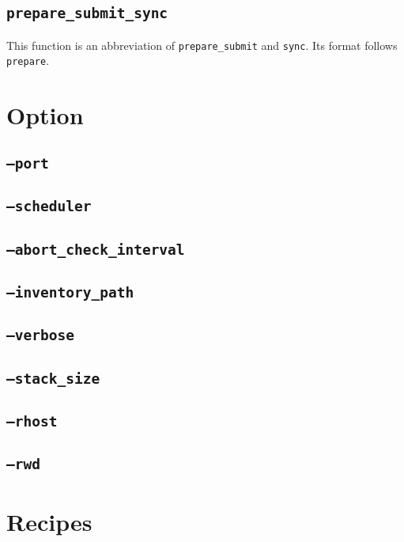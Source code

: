 \documentclass[a4paper,10pt]{report}
\begin{document}
\section{\texttt{prepare\_submit\_sync}}

This function is an abbreviation of \texttt{prepare\_submit} and
\texttt{sync}.  Its format follows \texttt{prepare}.

\chapter{Option}\label{chapoption}

\section{\texttt{--port}}
\section{\texttt{--scheduler}}
\section{\texttt{--abort\_check\_interval}}
\section{\texttt{--inventory\_path}}
\section{\texttt{--verbose}}
\section{\texttt{--stack\_size}}
\section{\texttt{--rhost}}
\section{\texttt{--rwd}}


\appendix
\chapter{Recipes}

\section{}
\end{document}
